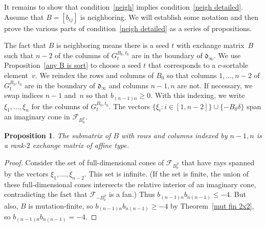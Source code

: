 \documentclass[10pt]{article}
\newtheorem{proposition}{Proposition}[section]
\theoremstyle{definition}
\theoremstyle{remark}
\numberwithin{equation}{section}
\newcommand{\set}[1]{{\lbrace #1 \rbrace}}
\newcommand{\F}{{\mathcal F}}
\newcommand{\0}{{\mathbf{0}}}
\renewcommand{\d}{{\mathfrak d}}
\begin{document}
It remains to show that condition~\ref{neigh} implies condition~\ref{neigh detailed}.
Assume that ${B=[b_{ij}]}$ is neighboring.
We will establish some notation and then prove the various parts of condition~\ref{neigh detailed} as a series of propositions.

The fact that $B$ is neighboring means there is a seed $t$ with exchange matrix~$B$ such that $n-2$ of the columns of $G^{B_0,t_0}_t$ are in the boundary of $\d_\infty$.
We use Proposition~\ref{any B is sort} to choose a seed $t$ that corresponds to a $c$-sortable element~$v$.
We reindex the rows and columns of $B_0$ so that columns $1,\ldots,n-2$ of $G^{B_0,t_0}_t$ are in the boundary of $\d_\infty$ and columns $n-1,n$ are not.
If necessary, we swap indices $n-1$ and~$n$ so that $b_{(n-1)n}\ge0$.
With this indexing, we write $\xi_1,\ldots,\xi_n$ for the columns of $G^{B_0,t_0}_t$.
The vectors $\set{\xi_i:i\in[1,n-2]}\cup\set{-B_0\delta}$ span an imaginary cone in $\F_{B_0^T}$.

\begin{proposition}\label{B44 aff}
The submatrix of $B$ with rows and columns indexed by $n-1,n$ is a rank-$2$ exchange matrix of affine type.
\end{proposition}
\begin{proof}
Consider the set of full-dimensional cones of $\F_{B_0^T}$ that have rays spanned by the vectors $\xi_1,\ldots,\xi_{n-2}$. 
This set is infinite.
(If the set is finite, the union of these full-dimensional cones intersects the relative interior of an imaginary cone, contradicting the fact that $\F_{-B_0^T}$ is a fan.)
Thus ${b_{(n-1)n}b_{n(n-1)}\le-4}$.
But also, $B$ is mutation-finite, so $b_{(n-1)n}b_{n(n-1)}\ge-4$ by Theorem~\ref{mut fin 2x2}, so ${b_{(n-1)n}b_{n(n-1)}=-4}$.
\end{proof}
\end{document}
